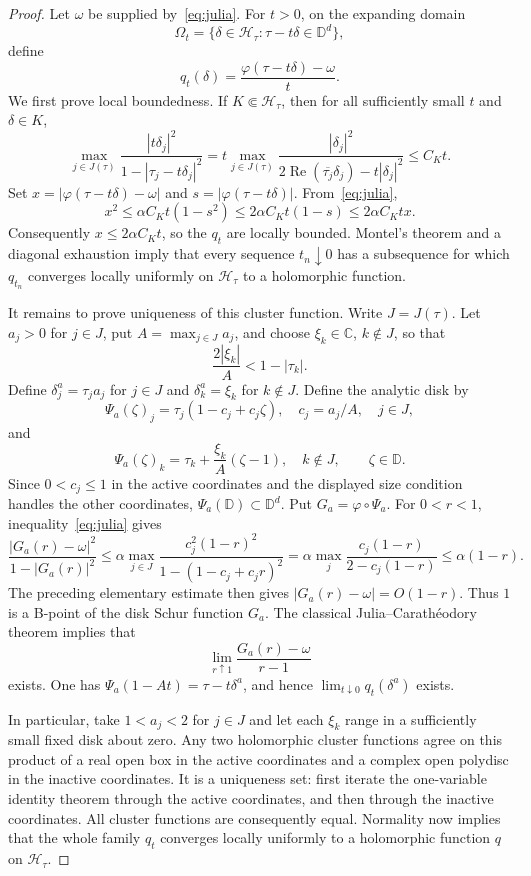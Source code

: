 \documentclass[11pt]{article}
\theoremstyle{definition}
\theoremstyle{remark}
\newcommand{\D}{\mathbb D}
\newcommand{\C}{\mathbb C}
\newcommand{\re}{\operatorname{Re}}
\begin{document}
\begin{proof}
Let \(\omega\) be supplied by~\eqref{eq:julia}.  For \(t>0\), on the expanding domain
\[
 \Omega_t=\{\delta\in\mathcal H_\tau:\tau-t\delta\in\D^d\},
\]
define
\[
 q_t(\delta)=\frac{\varphi(\tau-t\delta)-\omega}{t}.
\]
We first prove local boundedness.  If \(K\Subset\mathcal H_\tau\), then for all sufficiently small \(t\) and \(\delta\in K\),
\[
 \max_{j\in J(\tau)}\frac{|t\delta_j|^2}{1-|\tau_j-t\delta_j|^2}
 =t\max_{j\in J(\tau)}\frac{|\delta_j|^2}{2\re(\overline{\tau_j}\delta_j)-t|\delta_j|^2}
 \le C_Kt.
\]
Set \(x=|\varphi(\tau-t\delta)-\omega|\) and \(s=|\varphi(\tau-t\delta)|\).  From~\eqref{eq:julia},
\[
 x^2\le \alpha C_Kt(1-s^2)
 \le 2\alpha C_Kt(1-s)
 \le 2\alpha C_Kt x.
\]
Consequently \(x\le2\alpha C_Kt\), so the \(q_t\) are locally bounded.  Montel's theorem and a diagonal exhaustion imply that every sequence \(t_n\downarrow0\) has a subsequence for which \(q_{t_n}\) converges locally uniformly on \(\mathcal H_\tau\) to a holomorphic function.

It remains to prove uniqueness of this cluster function.  Write \(J=J(\tau)\).  Let \(a_j>0\) for \(j\in J\), put \(A=\max_{j\in J}a_j\), and choose \(\xi_k\in\C\), \(k\notin J\), so that
\[
 \frac{2|\xi_k|}{A}<1-|\tau_k|.
\]
Define \(\delta^a_j=\tau_ja_j\) for \(j\in J\) and \(\delta^a_k=\xi_k\) for \(k\notin J\).  Define the analytic disk by
\[
 \Psi_a(\zeta)_j=\tau_j(1-c_j+c_j\zeta),
 \quad c_j=a_j/A,\quad j\in J,
\]
and
\[
 \Psi_a(\zeta)_k=\tau_k+\frac{\xi_k}{A}(\zeta-1),
 \quad k\notin J,
 \qquad \zeta\in\D.
\]
Since \(0<c_j\le1\) in the active coordinates and the displayed size condition handles the other coordinates, \(\Psi_a(\D)\subset\D^d\).  Put \(G_a=\varphi\circ\Psi_a\).  For \(0<r<1\), inequality~\eqref{eq:julia} gives
\[
 \frac{|G_a(r)-\omega|^2}{1-|G_a(r)|^2}
 \le \alpha\max_{j\in J}
 \frac{c_j^2(1-r)^2}{1-(1-c_j+c_jr)^2}
 =\alpha\max_j\frac{c_j(1-r)}{2-c_j(1-r)}
 \le\alpha(1-r).
\]
The preceding elementary estimate then gives \(|G_a(r)-\omega|=O(1-r)\).  Thus \(1\) is a B-point of the disk Schur function \(G_a\).  The classical Julia--Carath\'eodory theorem implies that
\[
 \lim_{r\uparrow1}\frac{G_a(r)-\omega}{r-1}
\]
exists.  One has \(\Psi_a(1-At)=\tau-t\delta^a\), and hence \(\lim_{t\downarrow0}q_t(\delta^a)\) exists.

In particular, take \(1<a_j<2\) for \(j\in J\) and let each \(\xi_k\) range in a sufficiently small fixed disk about zero.  Any two holomorphic cluster functions agree on this product of a real open box in the active coordinates and a complex open polydisc in the inactive coordinates.  It is a uniqueness set: first iterate the one-variable identity theorem through the active coordinates, and then through the inactive coordinates.  All cluster functions are consequently equal.  Normality now implies that the whole family \(q_t\) converges locally uniformly to a holomorphic function \(q\) on \(\mathcal H_\tau\).


\end{proof}
\end{document}
